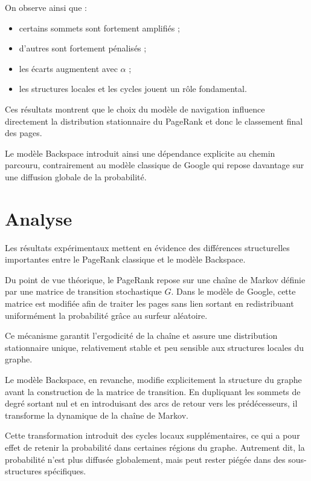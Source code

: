\documentclass[a4paper,11pt]{article}
\begin{document}
On observe ainsi que :

\begin{itemize}
    \item certains sommets sont fortement amplifiés ;
    \item d’autres sont fortement pénalisés ;
    \item les écarts augmentent avec $\alpha$ ;
    \item les structures locales et les cycles jouent un rôle fondamental.
\end{itemize}

Ces résultats montrent que le choix du modèle de navigation influence directement la distribution stationnaire du PageRank et donc le classement final des pages.

Le modèle Backspace introduit ainsi une dépendance explicite au chemin parcouru, contrairement au modèle classique de Google qui repose davantage sur une diffusion globale de la probabilité.

\section{Analyse}

Les résultats expérimentaux mettent en évidence des différences structurelles importantes entre le PageRank classique et le modèle Backspace.

Du point de vue théorique, le PageRank repose sur une chaîne de Markov définie par une matrice de transition stochastique $G$. Dans le modèle de Google, cette matrice est modifiée afin de traiter les pages sans lien sortant en redistribuant uniformément la probabilité grâce au surfeur aléatoire.

Ce mécanisme garantit l’ergodicité de la chaîne et assure une distribution stationnaire unique, relativement stable et peu sensible aux structures locales du graphe.

Le modèle Backspace, en revanche, modifie explicitement la structure du graphe avant la construction de la matrice de transition. En dupliquant les sommets de degré sortant nul et en introduisant des arcs de retour vers les prédécesseurs, il transforme la dynamique de la chaîne de Markov.

Cette transformation introduit des cycles locaux supplémentaires, ce qui a pour effet de retenir la probabilité dans certaines régions du graphe. Autrement dit, la probabilité n’est plus diffusée globalement, mais peut rester piégée dans des sous-structures spécifiques.
\end{document}
